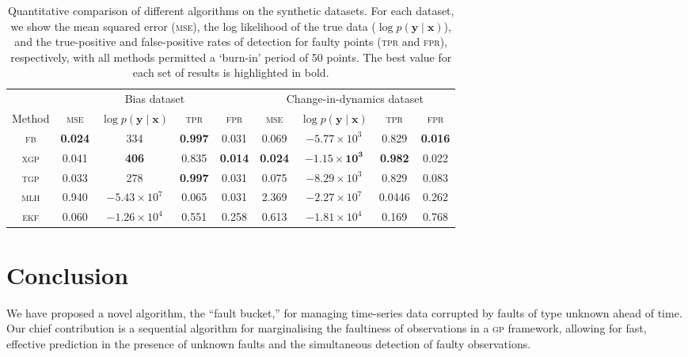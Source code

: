 \documentclass{article} %
\newcommand{\given}{\!\ensuremath{\mid}\!}
\newcommand{\bm}[1]{\ensuremath{\mathbf{#1}}}
\newcommand{\acro}[1]{\textsc{#1}}
\begin{document}
\begin{table}
  \centering
  \caption{Quantitative comparison of different algorithms on the
    synthetic datasets.  For each dataset, we show the mean squared error
    (\textsc{mse}), the log likelihood of the true data ($\log p(\bm{y}
    \given \bm{x})$), and the true-positive and false-positive rates
    of detection for faulty points (\textsc{tpr} and \textsc{fpr}),
    respectively, with all methods permitted a `burn-in' period of 50 points. The best value for each set of results is highlighted in
    bold.}
  \label{tbl:results}
  \begin{tabular}{ccccccccc}
    \toprule
& \multicolumn{4}{c}{Bias dataset} & \multicolumn{4}{c}{Change-in-dynamics dataset}\\
    \cmidrule(l){2-5} \cmidrule(l){6-9}
    Method & \scshape{mse} & $\log p(\bm{y}\given\bm{x})$ & \scshape{tpr} & \scshape{fpr} 
& \scshape{mse} & $\log p(\bm{y}\given\bm{x})$ & \scshape{tpr} & \scshape{fpr} \\
\midrule
    \scshape{fb} & \textbf{0.024} & 334 & \textbf{0.997} & 0.031 & 0.069 & $-5.77\times 10^3$ & 0.829 & \textbf{0.016} \\
    \scshape{xgp} & 0.041 & \textbf{406} & 0.835 & \textbf{0.014} & \textbf{0.024} & $\mathbf{-1.15 \times 10^3}$ & \textbf{0.982} & 0.022 \\
    \scshape{tgp} & 0.033 & 278 & \textbf{0.997} & 0.031 & 0.075 & $-8.29\times 10^3$ & 0.829 & 0.083 \\
    \scshape{mlh} & 0.940 & $-5.43\times 10^7$ & 0.065 & 0.031 & 2.369 & $-2.27\times 10^7$ & 0.0446 & 0.262 \\
   \scshape{ekf} & 0.060 & $-1.26 \times 10^4$ & 0.551 & 0.258 & 0.613 & $-1.81\times 10^4$ & 0.169 & 0.768 \\
    \bottomrule
  \end{tabular}
\end{table}

\section{Conclusion}
We have proposed a novel algorithm, the ``fault bucket,'' for managing
time-series data corrupted by faults of type unknown ahead of time. Our chief
contribution is a sequential algorithm for marginalising the
faultiness of observations in a \acro{gp} framework, allowing for
fast, effective prediction in the presence of unknown faults and the
simultaneous detection of faulty observations.

\small


\end{document}
